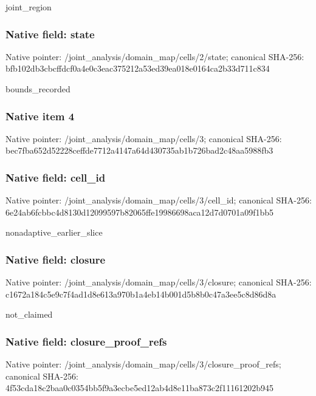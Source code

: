 \documentclass[10pt,a4paper]{article}
\begin{document}
\begingroup\raggedright\sloppy joint\_\allowbreak{}region\par\endgroup

\subsubsection{Native field: state}
Native pointer: /joint\_\allowbreak{}analysis/domain\_\allowbreak{}map/cells/2/state; canonical SHA-256: bfb102db3cbcffdcf0a4e0c3eac375212a53ed39ea018e0164ca2b33d711c834

\begingroup\raggedright\sloppy bounds\_\allowbreak{}recorded\par\endgroup

\subsubsection{Native item 4}
Native pointer: /joint\_\allowbreak{}analysis/domain\_\allowbreak{}map/cells/3; canonical SHA-256: bec7fba652d52228ceffde7712a4147a64d430735ab1b726bad2c48aa5988fb3

\subsubsection{Native field: cell\_\allowbreak{}id}
Native pointer: /joint\_\allowbreak{}analysis/domain\_\allowbreak{}map/cells/3/cell\_\allowbreak{}id; canonical SHA-256: 6e24ab6fcbbc4d8130d12099597b82065ffe19986698aca12d7d0701a09f1bb5

\begingroup\raggedright\sloppy nonadaptive\_\allowbreak{}earlier\_\allowbreak{}slice\par\endgroup

\subsubsection{Native field: closure}
Native pointer: /joint\_\allowbreak{}analysis/domain\_\allowbreak{}map/cells/3/closure; canonical SHA-256: c1672a184c5e9c7f4ad1d8e613a970b1a4eb14b001d5b8b0c47a3ee5c8d86d8a

\begingroup\raggedright\sloppy not\_\allowbreak{}claimed\par\endgroup

\subsubsection{Native field: closure\_\allowbreak{}proof\_\allowbreak{}refs}
Native pointer: /joint\_\allowbreak{}analysis/domain\_\allowbreak{}map/cells/3/closure\_\allowbreak{}proof\_\allowbreak{}refs; canonical SHA-256: 4f53cda18c2baa0c0354bb5f9a3ecbe5ed12ab4d8e11ba873c2f11161202b945
\end{document}
